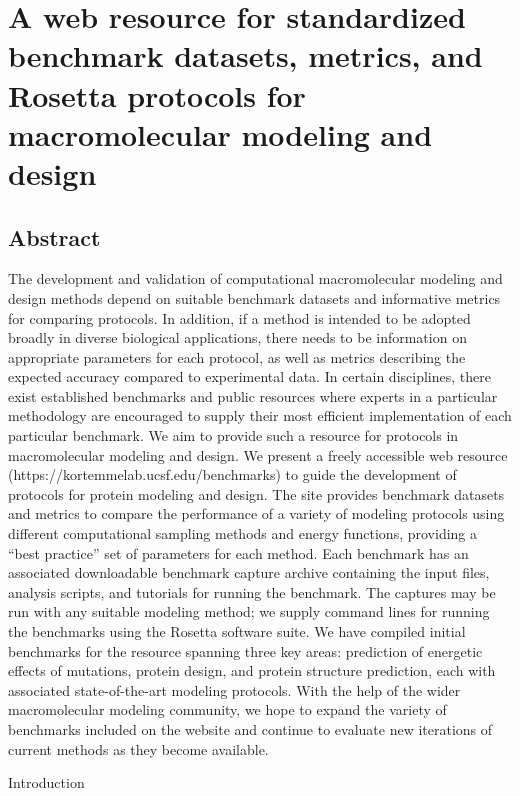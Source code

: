\chapter{A web resource for standardized benchmark datasets, metrics, and Rosetta protocols for macromolecular modeling and design}
\label{chapter:web-benchmark}


\section{Abstract}

The development and validation of computational macromolecular modeling and design methods depend on suitable benchmark datasets and informative metrics for comparing protocols. In addition, if a method is intended to be adopted broadly in diverse biological applications, there needs to be information on appropriate parameters for each protocol, as well as metrics describing the expected accuracy compared to experimental data. In certain disciplines, there exist established benchmarks and public resources where experts in a particular methodology are encouraged to supply their most efficient implementation of each particular benchmark. We aim to provide such a resource for protocols in macromolecular modeling and design. We present a freely accessible web resource (https://kortemmelab.ucsf.edu/benchmarks) to guide the development of protocols for protein modeling and design. The site provides benchmark datasets and metrics to compare the performance of a variety of modeling protocols using different computational sampling methods and energy functions, providing a “best practice” set of parameters for each method. Each benchmark has an associated downloadable benchmark capture archive containing the input files, analysis scripts, and tutorials for running the benchmark. The captures may be run with any suitable modeling method; we supply command lines for running the benchmarks using the Rosetta software suite. We have compiled initial benchmarks for the resource spanning three key areas: prediction of energetic effects of mutations, protein design, and protein structure prediction, each with associated state-of-the-art modeling protocols. With the help of the wider macromolecular modeling community, we hope to expand the variety of benchmarks included on the website and continue to evaluate new iterations of current methods as they become available.


Introduction


